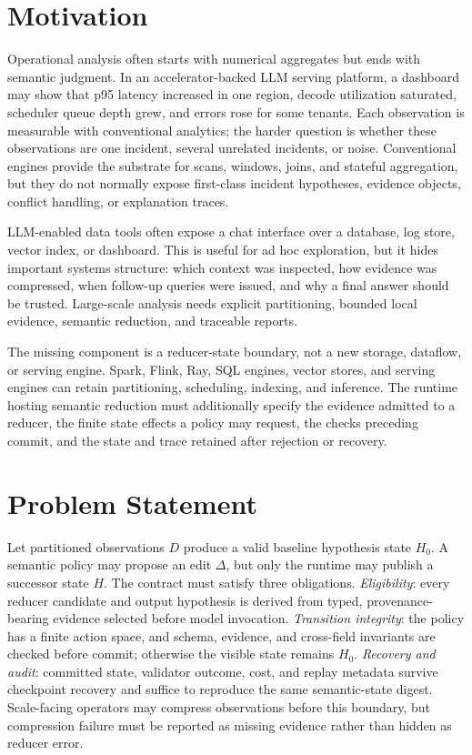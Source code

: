 \documentclass[sigplan,anonymous,nonacm]{acmart}
\begin{document}
\section{Motivation}

Operational analysis often starts with numerical aggregates but ends with semantic judgment. In an accelerator-backed LLM serving platform, a dashboard may show that p95 latency increased in one region, decode utilization saturated, scheduler queue depth grew, and errors rose for some tenants. Each observation is measurable with conventional analytics; the harder question is whether these observations are one incident, several unrelated incidents, or noise. Conventional engines provide the substrate for scans, windows, joins, and stateful aggregation, but they do not normally expose first-class incident hypotheses, evidence objects, conflict handling, or explanation traces.

LLM-enabled data tools often expose a chat interface over a database, log store, vector index, or dashboard. This is useful for ad hoc exploration, but it hides important systems structure: which context was inspected, how evidence was compressed, when follow-up queries were issued, and why a final answer should be trusted. Large-scale analysis needs explicit partitioning, bounded local evidence, semantic reduction, and traceable reports.

The missing component is a reducer-state boundary, not a new storage, dataflow, or serving engine. Spark, Flink, Ray, SQL engines, vector stores, and serving engines can retain partitioning, scheduling, indexing, and inference. The runtime hosting semantic reduction must additionally specify the evidence admitted to a reducer, the finite state effects a policy may request, the checks preceding commit, and the state and trace retained after rejection or recovery.

\section{Problem Statement}

Let partitioned observations $D$ produce a valid baseline hypothesis state $H_0$. A semantic policy may propose an edit $\Delta$, but only the runtime may publish a successor state $H$. The contract must satisfy three obligations. \emph{Eligibility}: every reducer candidate and output hypothesis is derived from typed, provenance-bearing evidence selected before model invocation. \emph{Transition integrity}: the policy has a finite action space, and schema, evidence, and cross-field invariants are checked before commit; otherwise the visible state remains $H_0$. \emph{Recovery and audit}: committed state, validator outcome, cost, and replay metadata survive checkpoint recovery and suffice to reproduce the same semantic-state digest. Scale-facing operators may compress observations before this boundary, but compression failure must be reported as missing evidence rather than hidden as reducer error.
\end{document}
